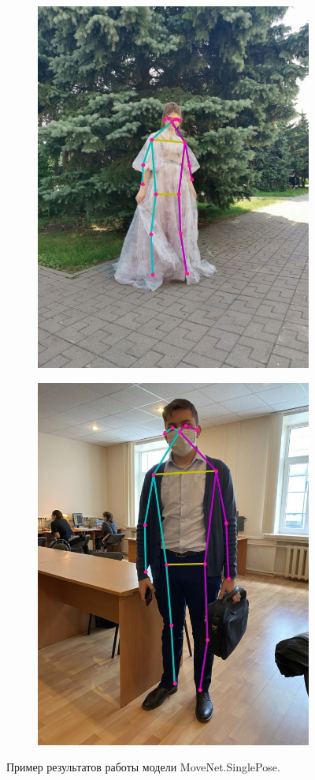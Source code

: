 \begin{figure}[h]
\begin{subfigure}[b]{.5\textwidth}
   \includegraphics[height=\textwidth]{./images/MoveNet/36}
   \caption{ }
\end{subfigure}
\begin{subfigure}[b]{.5\textwidth}
	\centering
   \includegraphics[height=\textwidth]{./images/MoveNet/33}
   \caption{ }
\end{subfigure}
   \caption{Пример результатов работы модели MoveNet.SinglePose.}
   \label{fig:MN_result}
\end{figure}

